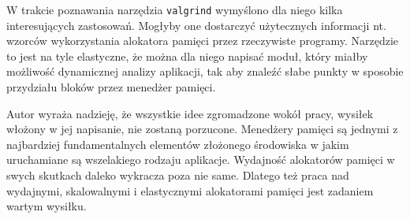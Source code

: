 \documentclass[12pt,a4paper,titlepage,twoside]{mwart}
\begin{document}
W trakcie poznawania narzędzia \texttt{valgrind} wymyślono dla niego kilka
interesujących zastosowań. Mogłyby one dostarczyć użytecznych informacji nt.
wzorców wykorzystania alokatora pamięci przez rzeczywiste programy.  Narzędzie
to jest na tyle elastyczne, że można dla niego napisać moduł, który miałby
możliwość dynamicznej analizy aplikacji, tak aby znaleźć słabe punkty w
sposobie przydziału bloków przez menedżer pamięci.

Autor wyraża nadzieję, że wszystkie idee zgromadzone wokół pracy, wysiłek
włożony w jej napisanie, nie zostaną porzucone. Menedżery pamięci są jednymi z
najbardziej fundamentalnych elementów złożonego środowiska w jakim uruchamiane
są wszelakiego rodzaju aplikacje. Wydajność alokatorów pamięci w swych skutkach
daleko wykracza poza nie same. Dlatego też praca nad wydajnymi, skalowalnymi i
elastycznymi alokatorami pamięci jest zadaniem wartym wysiłku.





\newpage


\nocite{berger00hoard}
\nocite{berger01composing}
\nocite{berger02reconsidering}
\nocite{bonwick94slab}
\nocite{chilimbi00designing}
\nocite{demaine99fast}
\nocite{douglea96malloc}
\nocite{evans06scalable}
\nocite{feng05localityimproving}
\nocite{fitzgibbons00linux}
\nocite{ghemawat07tcmalloc}
\nocite{gorman04linuxvm}
\nocite{iyengar96scalability}
\nocite{johnstone98memory}
\nocite{luby94tight}
\nocite{pas02memory}
\nocite{paul95dynamic}
\nocite{robson71estimate}
\nocite{robson74bounds}
\nocite{robson77worst}
\nocite{stephenson83fastfits}
\nocite{vuillemin80unifying}
\nocite{weinstock88quickfit}



\end{document}
